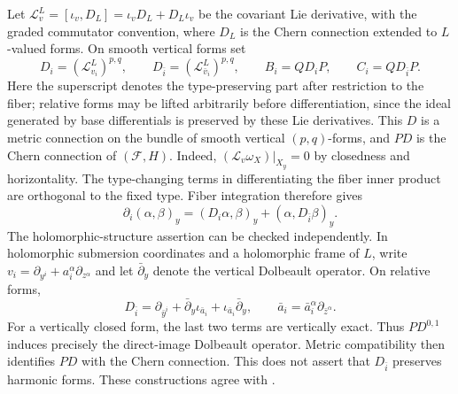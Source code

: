 \documentclass[11pt,reqno]{amsart}
\numberwithin{equation}{section}
\theoremstyle{definition}
\theoremstyle{remark}
\newcommand{\db}{\bar\partial}
\newcommand{\cF}{\mathcal F}
\begin{document}
Let $\mathcal L^L_v=[\iota_v,D_L]=\iota_vD_L+D_L\iota_v$ be the covariant Lie derivative, with the graded commutator convention, where $D_L$ is the Chern connection extended to $L$-valued forms. On smooth vertical forms set
\[
 D_i=(\mathcal L^L_{v_i})^{p,q},\qquad
 D_{\bar i}=(\mathcal L^L_{\bar v_i})^{p,q},\qquad
 B_i=QD_iP,\qquad C_i=QD_{\bar i}P.
\]
Here the superscript denotes the type-preserving part after restriction to the fiber; relative forms may be lifted arbitrarily before differentiation, since the ideal generated by base differentials is preserved by these Lie derivatives. This $D$ is a metric connection on the bundle of smooth vertical $(p,q)$-forms, and $PD$ is the Chern connection of $(\cF,H)$. Indeed, $(\mathcal L_v\omega_X)|_{X_y}=0$ by closedness and horizontality. The type-changing terms in differentiating the fiber inner product are orthogonal to the fixed type. Fiber integration therefore gives
\[
 \partial_i(\alpha,\beta)_y=(D_i\alpha,\beta)_y
                                    +(\alpha,D_{\bar i}\beta)_y.
\]
The holomorphic-structure assertion can be checked independently. In holomorphic submersion coordinates and a holomorphic frame of $L$, write $v_i=\partial_{y^i}+a_i^\alpha\partial_{z^\alpha}$ and let $\db_y$ denote the vertical Dolbeault operator. On relative forms,
\begin{equation}\label{eq:relative-dolbeault-homotopy}
 D_{\bar i}=\partial_{\bar y^i}
       +\db_y\iota_{\bar a_i}+\iota_{\bar a_i}\db_y,
 \qquad \bar a_i=\bar a_i^\alpha\partial_{\bar z^\alpha}.
\end{equation}
For a vertically closed form, the last two terms are vertically exact. Thus $PD^{0,1}$ induces precisely the direct-image Dolbeault operator. Metric compatibility then identifies $PD$ with the Chern connection. This does not assert that $D_{\bar i}$ preserves harmonic forms. These constructions agree with \cite[Sections 5--7]{CS24}.
\end{document}
